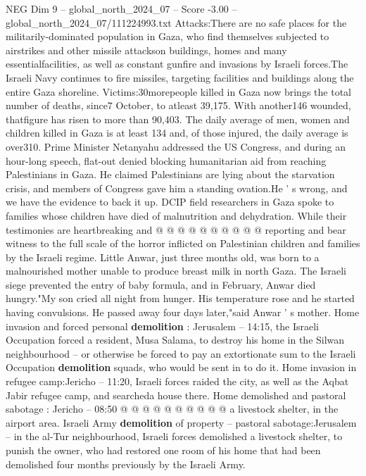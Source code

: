 \begin{textsample}{NEG Dim 9 – global\_north\_2024\_07 – Score -3.00 – global\_north\_2024\_07/111224993.txt}  \label{ex:f9_neg_137}
Attacks:There are no safe places for the militarily-dominated population in Gaza, who find themselves subjected to airstrikes and other missile attackson buildings, homes and many essentialfacilities, as well as constant gunfire and invasions by Israeli forces.The Israeli Navy continues to fire missiles, targeting facilities and buildings along the entire Gaza shoreline.
Victims:30morepeople killed in Gaza now brings the total number of deaths, since7 October, to atleast 39,175.
With another146 wounded, thatfigure has risen to more than 90,403.
The daily average of men, women and children killed in Gaza is at least 134 and, of those injured, the daily average is over310.
Prime Minister Netanyahu addressed the US Congress, and during an hour-long speech, flat-out denied blocking humanitarian aid from reaching Palestinians in Gaza.
He claimed Palestinians are lying about the starvation crisis, and members of Congress gave him a standing ovation.He ' s wrong, and we have the evidence to back it up.
DCIP field researchers in Gaza spoke to families whose children have died of malnutrition and dehydration.
While their testimonies are heartbreaking and @ @ @ @ @ @ @ @ @ @ reporting and bear witness to the full scale of the horror inflicted on Palestinian children and families by the Israeli regime.
Little Anwar, just three months old, was born to a malnourished mother unable to produce breast milk in north Gaza.
The Israeli siege prevented the entry of baby formula, and in February, Anwar died hungry."My son cried all night from hunger.
His temperature rose and he started having convulsions.
He passed away four days later,"said Anwar ' s mother.
Home invasion and forced personal \textbf{demolition} : Jerusalem -- 14:15, the Israeli Occupation forced a resident, Musa Salama, to destroy his home in the Silwan neighbourhood -- or otherwise be forced to pay an extortionate sum to the Israeli Occupation \textbf{demolition} squads, who would be sent in to do it.
Home invasion in refugee camp:Jericho -- 11:20, Israeli forces raided the city, as well as the Aqbat Jabir refugee camp, and searcheda house there.
Home demolished and pastoral sabotage : Jericho -- 08:50 @ @ @ @ @ @ @ @ @ @ a livestock shelter, in the airport area.
Israeli Army \textbf{demolition} of property -- pastoral sabotage:Jerusalem -- in the al-Tur neighbourhood, Israeli forces demolished a livestock shelter, to punish the owner, who had restored one room of his home that had been demolished four months previously by the Israeli Army.

\end{textsample}
